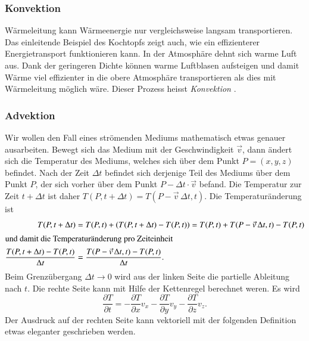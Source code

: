 \subsubsection{Konvektion}
Wärmeleitung kann Wärmeenergie nur vergleichsweise langsam transportieren.
Das einleitende Beispiel des Kochtopfs zeigt auch, wie ein effizienterer
Energietransport funktionieren kann.
In der Atmosphäre dehnt sich warme Luft aus.
Dank der geringeren Dichte können warme Luftblasen aufsteigen und damit
Wärme viel effizienter in die obere Atmosphäre transportieren
als dies mit Wärmeleitung möglich wäre.
Dieser Prozess heisst {\em Konvektion} \cite{skript:konvektion}.
%

\subsubsection{Advektion}
Wir wollen den Fall eines strömenden Mediums mathematisch etwas genauer
ausarbeiten.
Bewegt sich das Medium mit der Geschwindigkeit $\vec v$, dann ändert sich
die Temperatur des Mediums, welches sich über dem Punkt $P=(x,y,z)$
befindet.
Nach der Zeit $\Delta t$ befindet sich derjenige Teil des Mediums
über dem Punkt $P$, der sich vorher über dem Punkt $P-\Delta t\cdot\vec v$
befand.
Die Temperatur zur Zeit $t+\Delta t$ ist daher
$T(P,t+\Delta t)=T(P-\vec{v}\,\Delta t,t)$.
Die Temperaturänderung ist
\begin{align*}
T(P,t+\Delta t)
&=
T(P,t) + (T(P,t+\Delta t)-T(P,t))
=
T(P,t) + T(P-\vec v\,\Delta t, t)-T(P,t)
\\
\intertext{und damit die Temperaturänderung pro Zeiteinheit}
\frac{
T(P,t+\Delta t)
-
T(P,t)
}{\Delta t}
&=
\frac{
T(P-\vec{v}\,\Delta t, t)-T(P,t)
}{\Delta t}.
\end{align*}
Beim Grenzübergang $\Delta t\to 0$ wird aus der linken Seite die
partielle Ableitung nach $t$.
Die rechte Seite kann mit Hilfe der Kettenregel berechnet weren.
Es wird
\begin{equation}
\frac{\partial T}{\partial t}
=
-
\frac{\partial T}{\partial x} v_x
-
\frac{\partial T}{\partial y} v_y
-
\frac{\partial T}{\partial z} v_z.
\label{skript:advektion1}
\end{equation}
Der Ausdruck auf der rechten Seite kann vektoriell mit der folgenden
Definition etwas eleganter geschrieben werden.

